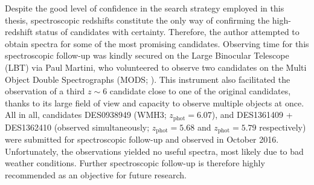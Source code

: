 Despite the good level of confidence in the search strategy employed in this thesis, spectroscopic redshifts constitute the only way of confirming the high-redshift status of candidates with certainty. Therefore, the author attempted to obtain spectra for some of the most promising \DESVIDEO candidates. Observing time for this spectroscopic follow-up was kindly secured on the Large Binocular Telescope (LBT) via Paul Martini, who volunteered to observe two candidates on the Multi Object Double Spectrographs (MODS; \citealt{2010SPIE.7735E..0AP}). This instrument also facilitated the observation of a third $z\sim6$ candidate close to one of the original candidates, thanks to its large field of view and capacity to observe multiple objects at once. All in all, candidates DES0938949 (WMH3;  $z_{\mathrm{phot}}=6.07$), and DES1361409 + DES1362410 (observed simultaneously; $z_{\mathrm{phot}}=5.68$ and $z_{\mathrm{phot}}=5.79$ respectively) were submitted for spectroscopic follow-up and observed in October 2016. Unfortunately, the observations yielded no useful spectra, most likely due to bad weather conditions. Further spectroscopic follow-up is therefore highly recommended as an objective for future research. \par 


